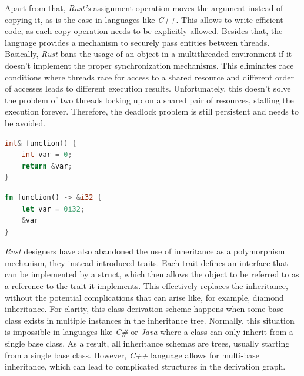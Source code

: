 Apart from that, \textit{Rust's} assignment operation moves the argument instead of copying it, as is the case in languages like \textit{C++}. This allows to write efficient code, as each copy operation needs to be explicitly allowed. Besides that, the language provides a mechanism to securely pass entities between threads. Basically, \textit{Rust} bans the usage of an object in a multithreaded environment if it doesn't implement the proper synchronization mechanisms. This eliminates race conditions where threads race for access to a shared resource and different order of accesses leads to different execution results. Unfortunately, this doesn't solve the problem of two threads locking up on a shared pair of resources, stalling the execution forever. Therefore, the deadlock problem is still persistent and needs to be avoided. 

\begin{minipage}{.4\textwidth}
    \begin{lstlisting}[language=c++,caption={Example of a memory corruption bug in C++.},captionpos=b,label={badcpp}]
int& function() {
    int var = 0;
    return &var;
}
    \end{lstlisting} 
\end{minipage}
\hfill\vline\hfill
\begin{minipage}{.4\textwidth}
    \begin{lstlisting}[language=rust,caption={Replicating a memory corruption bug in Rust.},captionpos=b,label={badrust}]
fn function() -> &i32 {
    let var = 0i32;
    &var
} 
    \end{lstlisting}
\end{minipage}

\textit{Rust} designers have also abandoned the use of inheritance as a polymorphism mechanism, they instead introduced traits. Each trait defines an interface that can be implemented by a struct, which then allows the object to be referred to as a reference to the trait it implements. This effectively replaces the inheritance, without the potential complications that can arise like, for example, diamond inheritance. For clarity, this class derivation scheme happens when some base class exists in multiple instances in the inheritance tree. Normally, this situation is impossible in languages like \textit{C\#} or \textit{Java} where a class can only inherit from a single base class. As a result, all inheritance schemas are trees, usually starting from a single base class. However, \textit{C++} language allows for multi-base inheritance, which can lead to complicated structures in the derivation graph.

